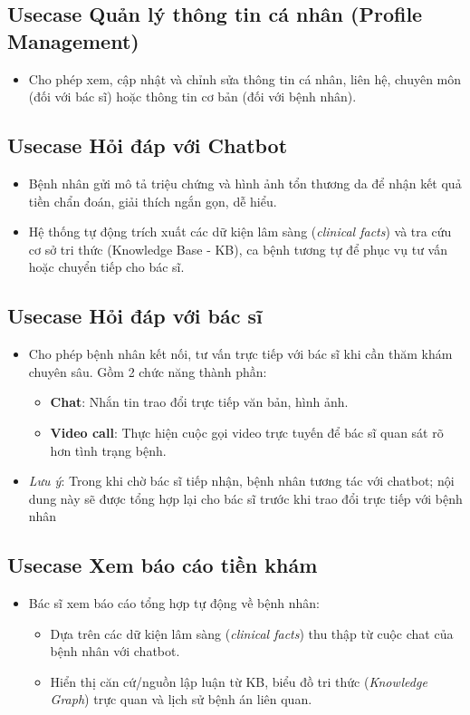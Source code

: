 \subsection{Usecase Quản lý thông tin cá nhân (Profile Management)}
\begin{itemize}
  \item Cho phép xem, cập nhật và chỉnh sửa thông tin cá nhân, liên hệ, chuyên môn (đối với bác sĩ) hoặc thông tin cơ bản (đối với bệnh nhân).
\end{itemize}

\subsection{Usecase Hỏi đáp với Chatbot}
\begin{itemize}
  \item Bệnh nhân gửi mô tả triệu chứng và hình ảnh tổn thương da để nhận kết quả tiền chẩn đoán, giải thích ngắn gọn, dễ hiểu.
  \item Hệ thống tự động trích xuất các dữ kiện lâm sàng (\textit{clinical facts}) và tra cứu cơ sở tri thức (Knowledge Base - KB), ca bệnh tương tự để phục vụ tư vấn hoặc chuyển tiếp cho bác sĩ.
\end{itemize}

\subsection{Usecase Hỏi đáp với bác sĩ}
\begin{itemize}
  \item Cho phép bệnh nhân kết nối, tư vấn trực tiếp với bác sĩ khi cần thăm khám chuyên sâu. Gồm 2 chức năng thành phần:
  \begin{itemize}
    \item \textbf{Chat}: Nhắn tin trao đổi trực tiếp văn bản, hình ảnh.
    \item \textbf{Video call}: Thực hiện cuộc gọi video trực tuyến để bác sĩ quan sát rõ hơn tình trạng bệnh.
  \end{itemize}
  \item \textit{Lưu ý}: Trong khi chờ bác sĩ tiếp nhận, bệnh nhân tương tác với chatbot; nội dung này sẽ được tổng hợp lại cho bác sĩ trước khi trao đổi trực tiếp với bệnh nhân
\end{itemize}

\subsection{Usecase Xem báo cáo tiền khám}
\begin{itemize}
  \item Bác sĩ xem báo cáo tổng hợp tự động về bệnh nhân:
  \begin{itemize}
    \item Dựa trên các dữ kiện lâm sàng (\textit{clinical facts}) thu thập từ cuộc chat của bệnh nhân với chatbot.
    \item Hiển thị căn cứ/nguồn lập luận từ KB, biểu đồ tri thức (\textit{Knowledge Graph}) trực quan và lịch sử bệnh án liên quan.
  \end{itemize}
\end{itemize}

